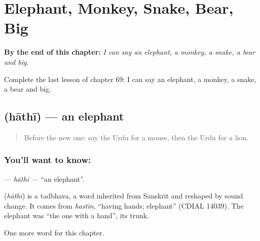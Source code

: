 
\chapter{Elephant, Monkey, Snake, Bear, Big}
\label{ch:ur-elephant-monkey-snake-bear-big}

\begin{chapteropening}
\textbf{By the end of this chapter:} \emph{I can say an elephant, a monkey, a snake, a bear and big.}

Complete the last lesson of chapter 69: I can say an elephant, a monkey, a snake, a bear and big.
\end{chapteropening}

\section[\texorpdfstring{\ur{ہاتھی} (hāthī)}{ہاتھی (hāthī)}]{ (hāthī) — an elephant}

\label{lesson:UR-C69-hathi}



\begin{quote}
Before the new one: say the Urdu for a mouse, then the Urdu for a lion.
\end{quote}

\subsection*{You'll want to know: }
\textbf{} — \emph{hāthī} — \textquotedblleft{}an elephant\textquotedblright{}.

\begin{cousinweb}
\textbf{} (\emph{hāthī}) is a tadbhava, a word inherited from Sanskrit and reshaped by sound change. It comes from \emph{hastin}, \textquotedblleft{}having hands; elephant\textquotedblright{} (CDIAL 14039). The elephant was \textquotedblleft{}the one with a hand\textquotedblright{}, its trunk.
\end{cousinweb}

\begin{grammarlens}[title={What you've built}]
One more word for this chapter.
\end{grammarlens}

